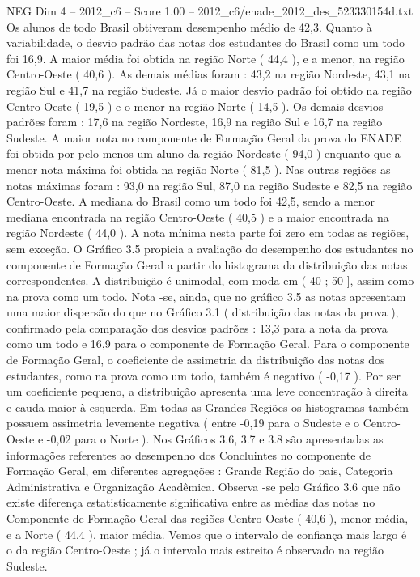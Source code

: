 \begin{textsample}{NEG Dim 4 – 2012\_c6 – Score 1.00 – 2012\_c6/enade\_2012\_des\_523330154d.txt}
Os alunos de todo Brasil obtiveram desempenho médio de 42,3.
Quanto à variabilidade, o desvio padrão das notas dos estudantes do Brasil como um todo foi 16,9.
A maior média foi obtida na região Norte ( 44,4 ), e a menor, na região Centro-Oeste ( 40,6 ).
As demais médias foram : 43,2 na região Nordeste, 43,1 na região Sul e 41,7 na região Sudeste.
Já o maior desvio padrão foi obtido na região Centro-Oeste ( 19,5 ) e o menor na região Norte ( 14,5 ).
Os demais desvios padrões foram : 17,6 na região Nordeste, 16,9 na região Sul e 16,7 na região Sudeste.
A maior nota no componente de Formação Geral da prova do ENADE foi obtida por pelo menos um aluno da região Nordeste ( 94,0 ) enquanto que a menor nota máxima foi obtida na região Norte ( 81,5 ).
Nas outras regiões as notas máximas foram : 93,0 na região Sul, 87,0 na região Sudeste e 82,5 na região Centro-Oeste.
A mediana do Brasil como um todo foi 42,5, sendo a menor mediana encontrada na região Centro-Oeste ( 40,5 ) e a maior encontrada na região Nordeste ( 44,0 ).
A nota mínima nesta parte foi zero em todas as regiões, sem exceção.
O Gráfico 3.5 propicia a avaliação do desempenho dos estudantes no componente de Formação Geral a partir do histograma da distribuição das notas correspondentes.
A distribuição é unimodal, com moda em ( 40 ; 50 ], assim como na prova como um todo.
Nota -se, ainda, que no gráfico 3.5 as notas apresentam uma maior dispersão do que no Gráfico 3.1 ( distribuição das notas da prova ), confirmado pela comparação dos desvios padrões : 13,3 para a nota da prova como um todo e 16,9 para o componente de Formação Geral.
Para o componente de Formação Geral, o coeficiente de assimetria da distribuição das notas dos estudantes, como na prova como um todo, também é negativo ( -0,17 ).
Por ser um coeficiente pequeno, a distribuição apresenta uma leve concentração à direita e cauda maior à esquerda.
Em todas as Grandes Regiões os histogramas também possuem assimetria levemente negativa ( entre -0,19 para o Sudeste e o Centro-Oeste e -0,02 para o Norte ).
Nos Gráficos 3.6, 3.7 e 3.8 são apresentadas as informações referentes ao desempenho dos Concluintes no componente de Formação Geral, em diferentes agregações : Grande Região do país, Categoria Administrativa e Organização Acadêmica.
Observa -se pelo Gráfico 3.6 que não existe diferença estatisticamente significativa entre as médias das notas no Componente de Formação Geral das regiões Centro-Oeste ( 40,6 ), menor média, e a Norte ( 44,4 ), maior média.
Vemos que o intervalo de confiança mais largo é o da região Centro-Oeste ; já o intervalo mais estreito é observado na região Sudeste.

\end{textsample}
